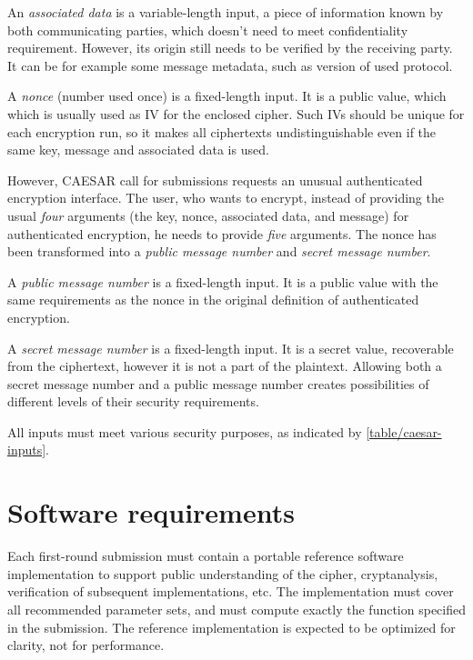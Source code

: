 An \textit{associated data} is a variable-length input, a piece of information known by both communicating parties, which doesn't need to meet confidentiality requirement. However, its origin still needs to be verified by the receiving party. It can be for example some message metadata, such as version of used protocol.

A \textit{nonce} (number used once) is a fixed-length input. It is a public value, which which is usually used as IV for the enclosed cipher. Such IVs should be unique for each encryption run, so it makes all ciphertexts undistinguishable even if the same key, message and associated data is used.

However, CAESAR call for submissions requests an unusual authenticated encryption interface. The user, who wants to encrypt, instead of providing the usual \textit{four} arguments (the key, nonce, associated data, and message) for authenticated encryption, he needs to provide \textit{five} arguments. The nonce has been transformed into a \textit{public message number} and \textit{secret message number}. \cite{cryptoeprint:2013:242}

A \textit{public message number} is a fixed-length input. It is a public value with the same requirements as the nonce in the original definition of authenticated encryption.

A \textit{secret message number} is a fixed-length input. It is a secret value, recoverable from the ciphertext, however it is not a part of the plaintext. Allowing both a secret message number and a public message number creates possibilities of different levels of their security requirements.

All inputs must meet various security purposes, as indicated by \autoref{table/caesar-inputs}.


\section{Software requirements}
\label{toc/caesar-api}

Each first-round submission must contain a portable reference software implementation to support public understanding of the cipher, cryptanalysis, verification of subsequent implementations, etc. The implementation must cover all recommended parameter sets, and must compute exactly the function specified in the submission. The reference implementation is expected to be optimized for clarity, not for performance. \cite{crypto-competitions}


